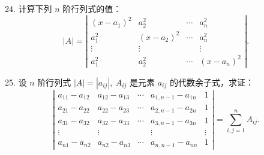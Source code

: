 \documentclass[UTF8,12pt,a4paper,fontset=fandol]{ctexart}
\begin{document}
24. 计算下列 $n$ 阶行列式的值：
\[
|A|=
\left|\begin{array}{cccc}
(x-a_1)^2&a_2^2&\cdots&a_n^2\\
a_1^2&(x-a_2)^2&\cdots&a_n^2\\
\vdots&\vdots&&\vdots\\
a_1^2&a_2^2&\cdots&(x-a_n)^2
\end{array}\right|.
\]

25. 设 $n$ 阶行列式 $|A|=|a_{ij}|,\ A_{ij}$ 是元素 $a_{ij}$ 的代数余子式，求证：
\[
\left|\begin{array}{ccccc}
a_{11}-a_{12}&a_{12}-a_{13}&\cdots&a_{1,n-1}-a_{1n}&1\\
a_{21}-a_{22}&a_{22}-a_{23}&\cdots&a_{2,n-1}-a_{2n}&1\\
a_{31}-a_{32}&a_{32}-a_{33}&\cdots&a_{3,n-1}-a_{3n}&1\\
\vdots&\vdots&&\vdots&\vdots\\
a_{n1}-a_{n2}&a_{n2}-a_{n3}&\cdots&a_{n,n-1}-a_{nn}&1
\end{array}\right|
=\sum_{i,j=1}^n A_{ij}.
\]
\end{document}
